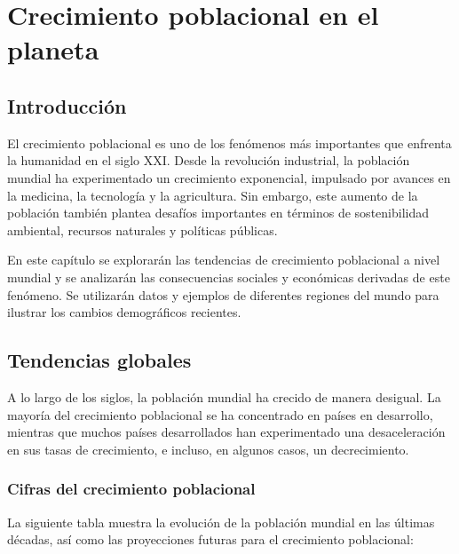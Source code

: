 \chapter{Crecimiento poblacional en el planeta}

\section{Introducción}

El crecimiento poblacional es uno de los fenómenos más importantes que enfrenta la humanidad en el siglo XXI. Desde la revolución industrial, la población mundial ha experimentado un crecimiento exponencial, impulsado por avances en la medicina, la tecnología y la agricultura. Sin embargo, este aumento de la población también plantea desafíos importantes en términos de sostenibilidad ambiental, recursos naturales y políticas públicas.

En este capítulo se explorarán las tendencias de crecimiento poblacional a nivel mundial y se analizarán las consecuencias sociales y económicas derivadas de este fenómeno. Se utilizarán datos y ejemplos de diferentes regiones del mundo para ilustrar los cambios demográficos recientes.

\section{Tendencias globales}

A lo largo de los siglos, la población mundial ha crecido de manera desigual. La mayoría del crecimiento poblacional se ha concentrado en países en desarrollo, mientras que muchos países desarrollados han experimentado una desaceleración en sus tasas de crecimiento, e incluso, en algunos casos, un decrecimiento.

\subsection{Cifras del crecimiento poblacional}

La siguiente tabla muestra la evolución de la población mundial en las últimas décadas, así como las proyecciones futuras para el crecimiento poblacional:

